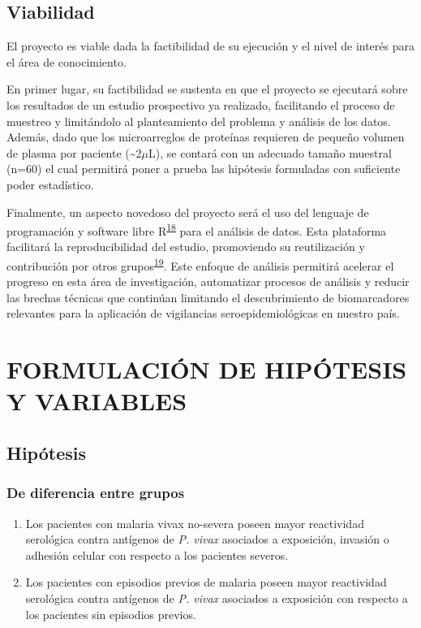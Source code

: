 \documentclass[]{article}
\begin{document}
\subsection{Viabilidad}\label{viabilidad}

El proyecto es viable dada la factibilidad de su ejecución y el nivel de
interés para el área de conocimiento.

En primer lugar, su factibilidad se sustenta en que el proyecto se
ejecutará sobre los resultados de un estudio prospectivo ya realizado,
facilitando el proceso de muestreo y limitándolo al planteamiento del
problema y análisis de los datos. Además, dado que los microarreglos de
proteínas requieren de pequeño volumen de plasma por paciente
(\textasciitilde{}2\(\mu\)L), se contará con un adecuado tamaño muestral
(n=60) el cual permitirá poner a prueba las hipótesis formuladas con
suficiente poder estadístico.

Finalmente, un aspecto novedoso del proyecto será el uso del lenguaje de
programación y software libre
R\textsuperscript{\protect\hyperlink{ref-R}{18}} para el análisis de
datos. Esta plataforma facilitará la reproducibilidad del estudio,
promoviendo su reutilización y contribución por otros
grupos\textsuperscript{\protect\hyperlink{ref-CienciaReproducible2016}{19}}.
Este enfoque de análisis permitirá acelerar el progreso en esta área de
investigación, automatizar procesos de análisis y reducir las brechas
técnicas que continúan limitando el descubrimiento de biomarcadores
relevantes para la aplicación de vigilancias seroepidemiológicas en
nuestro país.

\section{FORMULACIÓN DE HIPÓTESIS Y
VARIABLES}\label{formulacion-de-hipotesis-y-variables}

\subsection{Hipótesis}\label{hipotesis}

\subsubsection{De diferencia entre
grupos}\label{de-diferencia-entre-grupos}

\begin{enumerate}
\def\labelenumi{\arabic{enumi}.}
\item
  Los pacientes con malaria vivax no-severa poseen mayor reactividad
  serológica contra antígenos de \emph{P. vivax} asociados a exposición,
  invasión o adhesión celular con respecto a los pacientes severos.
\item
  Los pacientes con episodios previos de malaria poseen mayor
  reactividad serológica contra antígenos de \emph{P. vivax} asociados a
  exposición con respecto a los pacientes sin episodios previos.
\end{enumerate}
\end{document}

